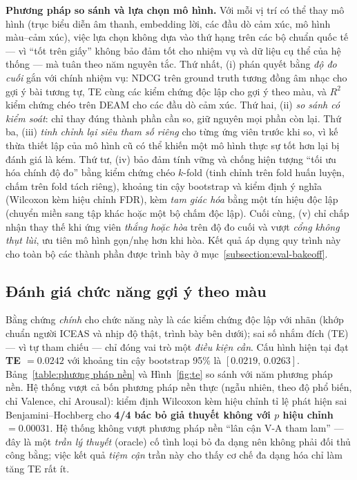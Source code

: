 \documentclass[../DoAn.tex]{subfiles}
\begin{document}
\textbf{Phương pháp so sánh và lựa chọn mô hình.} Với mỗi vị trí có thể thay mô hình (trục biểu diễn âm thanh, embedding lời, các đầu dò cảm xúc, mô hình màu--cảm xúc), việc lựa chọn không dựa vào thứ hạng trên các bộ chuẩn quốc tế --- vì ``tốt trên giấy'' không bảo đảm tốt cho nhiệm vụ và dữ liệu cụ thể của hệ thống --- mà tuân theo năm nguyên tắc. Thứ nhất, (i) phán quyết bằng \textit{độ đo cuối} gắn với chính nhiệm vụ: NDCG trên ground truth tương đồng âm nhạc cho gợi ý bài tương tự, TE cùng các kiểm chứng độc lập cho gợi ý theo màu, và $R^2$ kiểm chứng chéo trên DEAM cho các đầu dò cảm xúc. Thứ hai, (ii) \textit{so sánh có kiểm soát}: chỉ thay đúng thành phần cần so, giữ nguyên mọi phần còn lại. Thứ ba, (iii) \textit{tinh chỉnh lại siêu tham số riêng} cho từng ứng viên trước khi so, vì kế thừa thiết lập của mô hình cũ có thể khiến một mô hình thực sự tốt hơn lại bị đánh giá là kém. Thứ tư, (iv) bảo đảm tính vững và chống hiện tượng ``tối ưu hóa chính độ đo'' bằng kiểm chứng chéo $k$-fold (tinh chỉnh trên fold huấn luyện, chấm trên fold tách riêng), khoảng tin cậy bootstrap và kiểm định ý nghĩa (Wilcoxon kèm hiệu chỉnh FDR), kèm \textit{tam giác hóa} bằng một tín hiệu độc lập (chuyển miền sang tập khác hoặc một bộ chấm độc lập). Cuối cùng, (v) chỉ chấp nhận thay thế khi ứng viên \textit{thắng hoặc hòa} trên độ đo cuối và vượt \textit{cổng không thụt lùi}, ưu tiên mô hình gọn/nhẹ hơn khi hòa. Kết quả áp dụng quy trình này cho toàn bộ các thành phần được trình bày ở mục~\ref{subsection:eval-bakeoff}.

\subsection{Đánh giá chức năng gợi ý theo màu}
\label{subsection:eval-color}
Bằng chứng \textit{chính} cho chức năng này là các kiểm chứng độc lập với nhãn (khớp chuẩn người ICEAS và nhịp độ thật, trình bày bên dưới); sai số nhắm đích (TE) --- vì tự tham chiếu --- chỉ đóng vai trò một \textit{điều kiện cần}. Cấu hình hiện tại đạt \textbf{TE $= 0.0242$} với khoảng tin cậy bootstrap 95\% là $[0.0219,\,0.0263]$. Bảng~\ref{table:phương pháp nền} và Hình~\ref{fig:te} so sánh với năm phương pháp nền. Hệ thống vượt cả bốn phương pháp nền thực (ngẫu nhiên, theo độ phổ biến, chỉ Valence, chỉ Arousal): kiểm định Wilcoxon kèm hiệu chỉnh tỉ lệ phát hiện sai Benjamini--Hochberg \cite{benjamini1995fdr} cho \textbf{4/4 bác bỏ giả thuyết không với $p$ hiệu chỉnh $= 0.00031$}. Hệ thống không vượt phương pháp nền ``lân cận V-A tham lam'' --- đây là một \textit{trần lý thuyết} (oracle) cố tình loại bỏ đa dạng nên không phải đối thủ công bằng; việc kết quả \textit{tiệm cận} trần này cho thấy cơ chế đa dạng hóa chỉ làm tăng TE rất ít.
\end{document}
